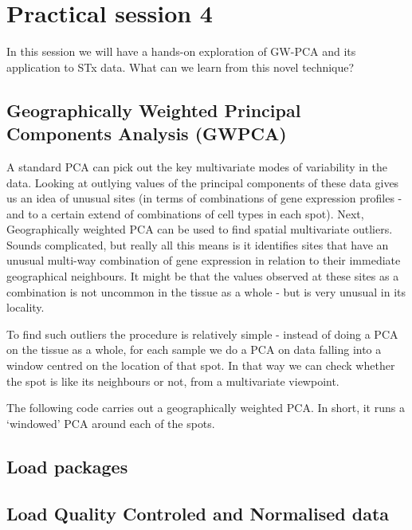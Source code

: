 \documentclass[
]{book}
\begin{document}
\hypertarget{practical-session-4}{%
\chapter{Practical session 4}\label{practical-session-4}}

In this session we will have a hands-on exploration of GW-PCA and its application to STx data. What can we learn from this novel technique?

\hypertarget{geographically-weighted-principal-components-analysis-gwpca}{%
\section{Geographically Weighted Principal Components Analysis (GWPCA)}\label{geographically-weighted-principal-components-analysis-gwpca}}

A standard PCA can pick out the key multivariate modes of variability in the data. Looking at outlying values of the principal components of these data gives us an idea of unusual sites (in terms of combinations of gene expression profiles -and to a certain extend of combinations of cell types in each spot). Next, Geographically weighted PCA can be used to find spatial multivariate outliers. Sounds complicated, but really all this means is it identifies sites that have an unusual multi-way combination of gene expression in relation to their immediate geographical neighbours. It might be that the values observed at these sites as a combination is not uncommon in the tissue as a whole - but is very unusual in its locality.

To find such outliers the procedure is relatively simple - instead of doing a PCA on the tissue as a whole, for each sample we do a PCA on data falling into a window centred on the location of that spot. In that way we can check whether the spot is like its neighbours or not, from a multivariate viewpoint.

The following code carries out a geographically weighted PCA. In short, it runs a `windowed' PCA around each of the spots.

\hypertarget{load-packages}{%
\section{Load packages}\label{load-packages}}

\hypertarget{load-quality-controled-and-normalised-data}{%
\section{Load Quality Controled and Normalised data}\label{load-quality-controled-and-normalised-data}}
\end{document}
